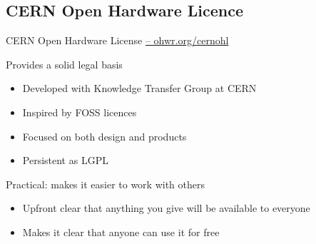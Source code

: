 \documentclass[compress,red]{beamer}
\begin{document}

\subsection{CERN Open Hardware Licence}

\begin{frame}{CERN Open Hardware License \href{http://ohwr.org/cernohl}{-- ohwr.org/cernohl}}
	\begin{block}{Provides a solid legal basis}
   \begin{itemize}
	\item Developed with Knowledge Transfer Group at CERN 
	\item Inspired by FOSS licences
	\item Focused on both design and products
	\item Persistent as LGPL
   \end{itemize}
	\end{block}

\begin{block}{Practical: makes it easier to work with others}
   \begin{itemize}
	\item Upfront clear that anything you give will be available to everyone
	\item Makes it clear that anyone can use it for free
   \end{itemize}
\end{block}
\end{frame}
\end{document}
